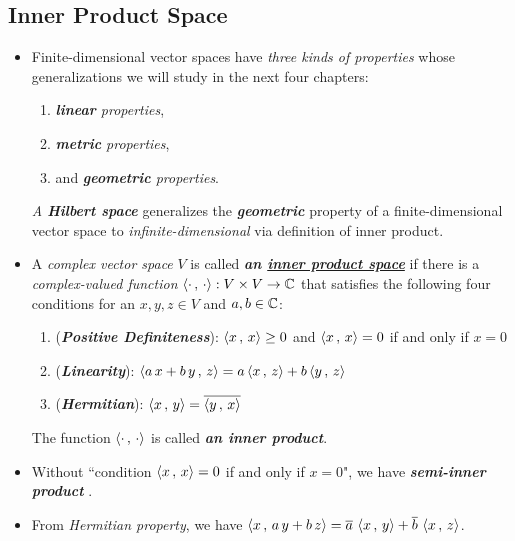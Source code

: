\documentclass[11pt]{article}
\begin{document}
\subsection{Inner Product Space}
\begin{itemize}
\item \begin{remark}
Finite-dimensional vector spaces have \emph{three kinds of properties} whose generalizations we will study in the next four chapters:
\begin{enumerate}
\item \emph{\textbf{linear} properties},
\item \emph{\textbf{metric} properties}, 
\item and \emph{\textbf{geometric} properties}.
\end{enumerate}
\emph{A \textbf{Hilbert space}} generalizes the \emph{\textbf{geometric}} property of a finite-dimensional vector space to \emph{infinite-dimensional} via definition of inner product.
\end{remark}

\item \begin{definition}
A \emph{complex vector space} $V$ is called \emph{\textbf{an \underline{inner product space}}} if there is a \emph{complex-valued function} $\left\langle \cdot\,,\, \cdot \right\rangle: V \times V \rightarrow {\mathbb C}$ that satisfies the following four conditions for an $x, y, z \in V$ and $a,b \in {\mathbb C}$:
\begin{enumerate}
\item (\textbf{\emph{Positive Definiteness}}): $\left\langle x\,,\, x \right\rangle \ge 0$ and $\left\langle x\,,\, x \right\rangle = 0$ if and only if $x = 0$
\item (\textbf{\emph{Linearity}}):  $\left\langle a\,x + b\,y\,,\, z \right\rangle = a\left\langle x\,,\, z \right\rangle + b\left\langle y\,,\, z \right\rangle$ 
\item (\textbf{\emph{Hermitian}}):  $\left\langle x\,,\, y \right\rangle = \overline{\left\langle y\,,\, x \right\rangle}$
\end{enumerate}
The function  $\left\langle \cdot\,,\, \cdot \right\rangle$  is called \emph{\textbf{an inner product}}.
\end{definition}



\item \begin{remark}
Without ``condition $\left\langle x\,,\, x \right\rangle = 0$ if and only if $x = 0$", we have \emph{\textbf{semi-inner product}} \citep{conway2019course}.
\end{remark}

\item \begin{remark}
From \emph{Hermitian property}, we have $\left\langle x\,,\, a\,y + b\,z \right\rangle =\overline{a}\, \left\langle x\,,\, y \right\rangle + \overline{b}\, \left\langle x\,,\, z \right\rangle$.
\end{remark}


\end{itemize}
\end{document}
